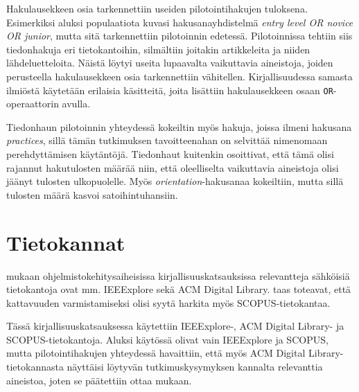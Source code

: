 \documentclass[utf8]{gradu3}
\begin{document}
Hakulausekkeen osia tarkennettiin useiden pilotointihakujen tuloksena. Esimerkiksi aluksi populaatiota kuvasi hakusanayhdistelmä \textit{entry level OR novice OR junior}, mutta sitä tarkennettiin pilotoinnin edetessä. Pilotoinnissa tehtiin siis tiedonhakuja eri tietokantoihin, silmältiin joitakin artikkeleita ja niiden lähdeluetteloita. Näistä löytyi useita lupaavalta vaikuttavia aineistoja, joiden perusteella hakulausekkeen osia tarkennettiin vähitellen. Kirjallisuudessa samasta ilmiöstä käytetään erilaisia käsitteitä, joita lisättiin hakulausekkeen osaan {\tt OR}-operaattorin avulla.

Tiedonhaun pilotoinnin yhteydessä kokeiltin myös hakuja, joissa ilmeni hakusana \textit{practices}, sillä tämän tutkimuksen tavoitteenahan on selvittää nimenomaan perehdyttämisen käytäntöjä. Tiedonhaut kuitenkin osoittivat, että tämä olisi rajannut hakutulosten määrää niin, että oleelliselta vaikuttavia aineistoja olisi jäänyt tulosten ulkopuolelle. Myös \textit{orientation}-hakusanaa kokeiltiin, mutta sillä tulosten määrä kasvoi satoihintuhansiin. 

\section{Tietokannat}

\textcite{brereton-ym-2007} mukaan ohjelmistokehitysaiheisissa kirjallisuuskatsauksissa relevantteja sähköisiä tietokantoja ovat mm. IEEExplore sekä ACM Digital Library. \textcite{kitchenham-charters-2007} taas toteavat, että kattavuuden varmistamiseksi olisi syytä harkita myös SCOPUS-tietokantaa.

Tässä kirjallisuuskatsauksessa käytettiin IEEExplore-, ACM Digital Library- ja SCOPUS-tietokantoja. Aluksi käytössä olivat vain IEEExplore ja SCOPUS, mutta pilotointihakujen yhteydessä havaittiin, että myös ACM Digital Library-tietokannasta näyttäisi löytyvän tutkimuskysymyksen kannalta relevanttia aineistoa, joten se päätettiin ottaa mukaan.
\end{document}
